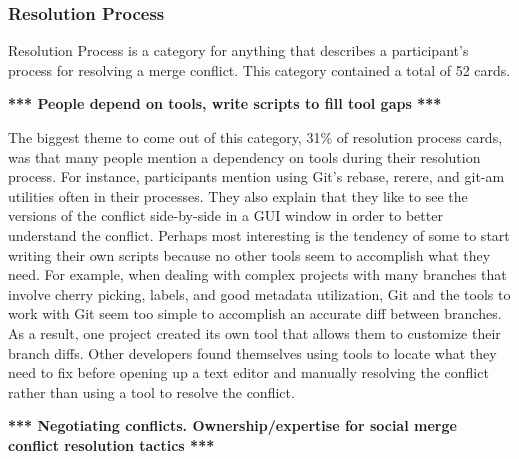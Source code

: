 \subsubsection{Resolution Process}

Resolution Process is a category for anything that describes a participant's process for resolving a merge conflict. This category contained a total of 52 cards.

\textbf{*** People depend on tools, write scripts to fill tool gaps ***}

The biggest theme to come out of this category, 31\% of resolution process cards, was that many people mention a dependency on tools during their resolution process. For instance, participants mention using Git's rebase, rerere, and git-am utilities often in their processes. They also explain that they like to see the versions of the conflict side-by-side in a GUI window in order to better understand the conflict. Perhaps most interesting is the tendency of some to start writing their own scripts because no other tools seem to accomplish what they need. For example, when dealing with complex projects with many branches that involve cherry picking, labels, and good metadata utilization, Git and the tools to work with Git seem too simple to accomplish an accurate diff between branches. As a result, one project created its own tool that allows them to customize their branch diffs. Other developers found themselves using tools to locate what they need to fix before opening up a text editor and manually resolving the conflict rather than using a tool to resolve the conflict.

\textbf{*** Negotiating conflicts. Ownership/expertise for social merge conflict resolution tactics ***}

